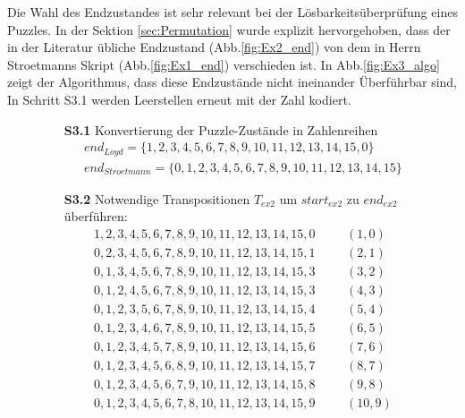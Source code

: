 %
%
Die Wahl des Endzustandes ist sehr relevant bei der Lösbarkeitsüberprüfung eines Puzzles. In der Sektion \ref{sec:Permutation} wurde explizit hervorgehoben, dass der in der Literatur übliche Endzustand (Abb.\ref{fig:Ex2_end}) von dem in Herrn Stroetmanns Skript \autocite{github-stroetmann:online} (Abb.\ref{fig:Ex1_end}) verschieden ist. In Abb.\ref{fig:Ex3_algo} zeigt der Algorithmus, dass diese Endzustände nicht ineinander Überführbar sind, In Schritt S3.1 werden Leerstellen erneut mit der Zahl  kodiert.
\begin{figure}[H]
	\begin{enumerate}
		\item[\textbf{S3.1}] Konvertierung der Puzzle-Zustände in Zahlenreihen
		\begin{align*}
		end_{Loyd} = \{1,2,3,4,5,6,7,8,9,10,11,12,13,14,15,0\} \\
		end_{Stroetmann} = \{0,1,2,3,4,5,6,7,8,9,10,11,12,13,14,15\}
		\end{align*}
		\item[\textbf{S3.2}] Notwendige Transpositionen $T_{ex2}$ um $start_{ex2}$ zu $end_{ex2}$ überführen:
		\begin{align*}			
		1,2,3,4,5,6,7,8,9,10,11,12,13,14,15,0 &\hspace{20pt} (1,0)\\
		0,2,3,4,5,6,7,8,9,10,11,12,13,14,15,1 &\hspace{20pt} (2,1)\\
		0,1,3,4,5,6,7,8,9,10,11,12,13,14,15,3 &\hspace{20pt} (3,2)\\
		0,1,2,4,5,6,7,8,9,10,11,12,13,14,15,3 &\hspace{20pt} (4,3)\\
		0,1,2,3,5,6,7,8,9,10,11,12,13,14,15,4 &\hspace{20pt} (5,4)\\
		0,1,2,3,4,6,7,8,9,10,11,12,13,14,15,5 &\hspace{20pt} (6,5)\\
		0,1,2,3,4,5,7,8,9,10,11,12,13,14,15,6 &\hspace{20pt} (7,6)\\
		0,1,2,3,4,5,6,8,9,10,11,12,13,14,15,7 &\hspace{20pt} (8,7)\\
		0,1,2,3,4,5,6,7,9,10,11,12,13,14,15,8 &\hspace{20pt} (9,8)\\
		0,1,2,3,4,5,6,7,8,10,11,12,13,14,15,9 &\hspace{20pt} (10,9)\\

\end{align*}
\end{enumerate}
\end{figure}
